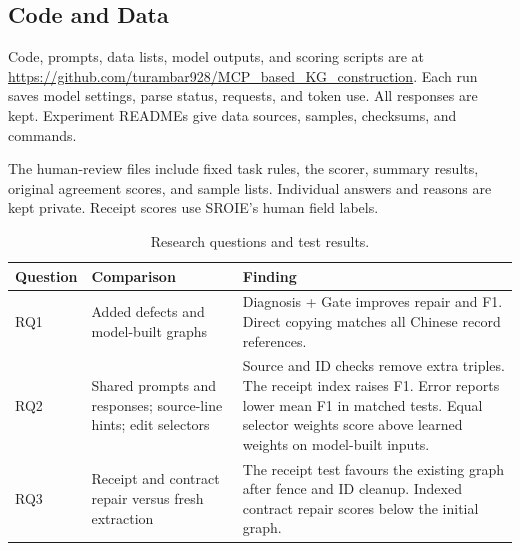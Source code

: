 \subsection{Code and Data}

Code, prompts, data lists, model outputs, and scoring scripts are at
\url{https://github.com/turambar928/MCP_based_KG_construction}.
Each run saves model settings, parse status, requests, and token use.
All responses are kept. Experiment READMEs give data sources, samples,
checksums, and commands.

The human-review files include fixed task rules, the scorer, summary results,
original agreement scores, and sample lists. Individual answers and reasons
are kept private. Receipt scores use SROIE's human field labels.

\begin{table}[t]
\centering
\caption{Research questions and test results.}
\label{tab:research_answers}
\small
\begin{tabularx}{\textwidth}{@{}p{}XX@{}}
\toprule
Question & Comparison & Finding \\
\midrule
RQ1 & Added defects and model-built graphs
& Diagnosis + Gate improves repair and F1. Direct copying matches all Chinese record references. \\
RQ2 & Shared prompts and responses; source-line hints; edit selectors
& Source and ID checks remove extra triples. The receipt index raises F1. Error reports lower mean F1 in matched tests. Equal selector weights score above learned weights on model-built inputs. \\
RQ3 & Receipt and contract repair versus fresh extraction
& The receipt test favours the existing graph after fence and ID cleanup. Indexed contract repair scores below the initial graph. \\
\bottomrule
\end{tabularx}
\end{table}
